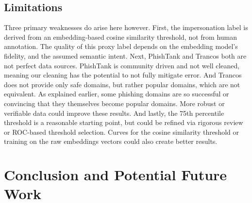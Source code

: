 \documentclass[conference]{IEEEtran}
\begin{document}
\subsection{Limitations}
Three primary weaknesses do arise here however. First, the impersonation label is derived from an embedding-based cosine similarity threshold, not from human annotation. The quality of this proxy label depends on the embedding model's fidelity, and the assumed semantic intent.
Next, PhishTank and Trancos both are not perfect data sources. PhishTank is community driven and not well cleaned, meaning our cleaning has the potential to not fully mitigate error. And Trancos does not provide only safe domains, but rather popular domains, which are not equivalent. As explained earlier, some phishing domains are so successful or convincing that they themselves become popular domains. More robust or verifiable data could improve these results.
And lastly, the 75th percentile threshold is a reasonable starting point, but could be refined via rigorous review or ROC-based threshold selection. Curves for the cosine similarity threshold or training on the raw embeddings vectors could also create better results.

\section{Conclusion and Potential Future Work}
\end{document}
